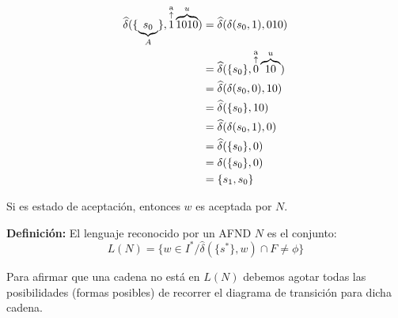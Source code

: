\begin{align*}
\widehat{\delta}(\{\underbrace{s_0}_{A}\},\uplegend{1}{a}\overbrace{1010}^{u}) &=\widehat{\delta}(\delta(s_0,1),010)	\\
					  &=\widehat{\delta}(\{s_0\},\uplegend{0}{a}\overbrace{10}^{u})\\
					  &=\widehat{\delta}(\delta(s_0,0),10)	\\
					  &=\widehat{\delta}(\{s_0\},10)	\\
					  &=\widehat{\delta}(\delta(s_0,1),0)	\\
					  &=\widehat{\delta}(\{s_0\},0)	\\
					  &=\delta(\{s_0\},0)	\\
					  &=\{s_1,s_0\}
\end{align*}

Si es estado de aceptación, entonces $w$ es aceptada por $N$.

\textbf{Definición: }El lenguaje reconocido por un AFND $N$ es el conjunto:
$$L(N)=\{ w\in I^* / \widehat{\delta}(\{s^*\}, w)\cap F\not= \phi\}$$

Para afirmar que una cadena no está en $L(N)$ debemos agotar todas las posibilidades (formas posibles) de recorrer el diagrama de transición para dicha cadena.
